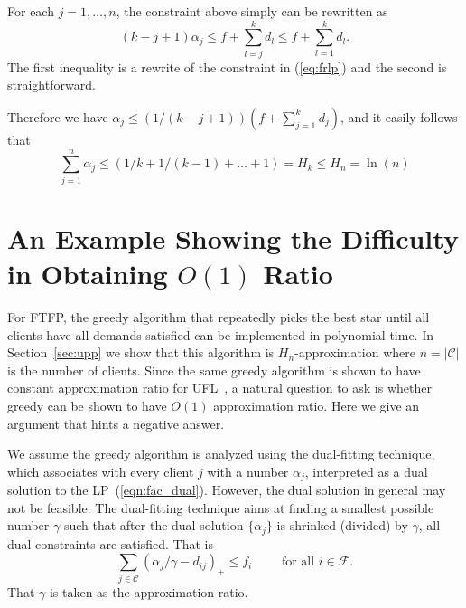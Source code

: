 \documentclass[oneside,final]{ucr}
\begin{document}
For each $j=1,\ldots,n$, the constraint above simply can be
rewritten as
\begin{equation}
  (k-j+1) \alpha_j \leq f + \sum_{l=j}^k d_l \leq f +
  \sum_{l=1}^k d_l.
\end{equation}
The first inequality is a rewrite of the constraint in
(\ref{eq:frlp}) and the second is straightforward.

Therefore we have $\alpha_j \leq (1/(k-j+1)) (f +
\sum_{j=1}^k d_j)$, and it easily follows that
\begin{equation}
  \sum_{j=1}^n \alpha_j \leq (1/k + 1/(k-1) + \ldots + 1) =
  H_k \leq H_n = \ln(n)
\end{equation}

\section{An Example Showing the Difficulty in Obtaining
  $O(1)$ Ratio}

For FTFP, the greedy algorithm that repeatedly picks the
best star until all clients have all demands satisfied can
be implemented in polynomial time. In Section~\ref{sec:upp}
we show that this algorithm is $H_n$-approximation where
$n=|\mathcal C|$ is the number of clients. Since the same
greedy algorithm is shown to have constant approximation
ratio for UFL~\cite{MahdianMSV01}, a natural question to
ask is whether greedy can be shown to have $O(1)$
approximation ratio. Here we give an argument that hints a
negative answer.

We assume the greedy algorithm is analyzed using the
dual-fitting technique, which associates with every client
$j$ with a number $\alpha_j$, interpreted as a dual solution
to the LP~(\ref{eqn:fac_dual}). However, the dual solution
in general may not be feasible. The dual-fitting technique
aims at finding a smallest possible number $\gamma$ such
that after the dual solution $\{\alpha_j\}$ is shrinked
(divided) by $\gamma$, all dual constraints are
satisfied. That is
\begin{equation*}
\sum_{j\in \mathcal C} (\alpha_j/\gamma
- d_{ij})_+ \leq f_i \qquad \text{ for all } i\in \mathcal F. 
\end{equation*}
That $\gamma$ is taken as the approximation ratio.
\end{document}
